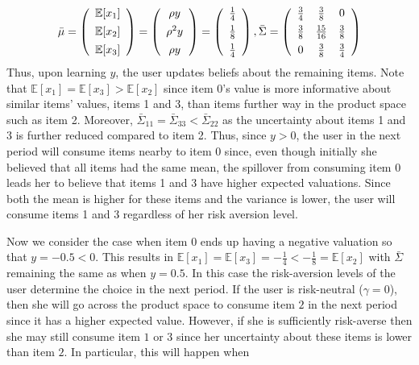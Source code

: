 \documentclass[manuscript]{acmart}
\begin{document}
\[ \bar{\mu} =   \left (\begin{array}{c}
\mathbb{E}[x_1] \vspace{0.15cm} \\
\mathbb{E}[x_2] \vspace{0.15cm} \\
\mathbb{E}[x_3]
\end{array}  \right) =\left (\begin{array}{c}
\rho y  \vspace{0.15cm} \\
\rho^{2} y  \vspace{0.15cm} \\
 \rho y \\
\end{array} \right) =
\left (\begin{array}{c}
\frac{1}{4} \vspace{0.15cm} \\
\frac{1}{8}  \vspace{0.15cm} \\
\frac{1}{4}
\end{array}  \right), \bar{\Sigma} =  \left( \begin{array}{ccc}
\frac{3}{4} & \frac{3}{8} & 0 \vspace{0.15cm} \\
\frac{3}{8} & \frac{15}{16} & \frac{3}{8} \vspace{0.15cm}  \\
0 &\frac{3}{8} & \frac{3}{4}  \\
\end{array} \right)
\]
Thus, upon learning $y$, the user updates beliefs about the remaining items. Note that $\mathbb{E}[x_1] = \mathbb{E}[x_3] > \mathbb{E}[x_2]$ since item 0's value is more informative about similar items' values, items 1 and 3, than items further way in the product space such as item 2. Moreover, $\bar{\Sigma}_{11} = \bar{\Sigma}_{33} < \bar{\Sigma}_{22}$ as the uncertainty about items 1 and 3 is further reduced compared to item 2. Thus, since $y > 0$, the user in the next period will consume items nearby to item 0 since, even though initially she believed that all items had the same mean, the spillover from consuming item 0 leads her to believe that items 1 and 3 have higher expected valuations. Since both the mean is higher for these items and the variance is lower, the user will consume items 1 and 3 regardless of her risk aversion level.
\par 
Now we consider the case when item 0 ends up having a negative valuation so that $y = -0.5 < 0$. This results in $\mathbb{E}[x_1] = \mathbb{E}[x_3] = -\frac{1}{4} <  -\frac{1}{8} = \mathbb{E}[x_2]$ with $\bar{\Sigma}$ remaining the same as when $y = 0.5$. In this case the risk-aversion levels of the user determine the choice in the next period. If the user is risk-neutral ($\gamma = 0$), then she will go across the product space to consume item $2$ in the next period since it has a higher expected value. However, if she is sufficiently risk-averse then she may still consume item $1$ or $3$ since her uncertainty about these items is lower than item $2$. In particular, this will happen when 
\end{document}
